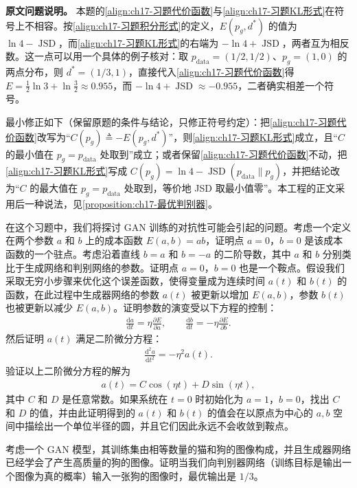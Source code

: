 \documentclass[../../main.tex]{subfiles}
\begin{document}
\begin{remark}\textbf{原文问题说明。}
本题的\eqref{align:ch17-习题代价函数}与\eqref{align:ch17-习题KL形式}在符号上不相容。按\eqref{align:ch17-习题积分形式}的定义，$E(p_g,d^*)$ 的值为 $\ln4-\operatorname{JSD}$，而\eqref{align:ch17-习题KL形式}的右端为 $-\ln4+\operatorname{JSD}$，两者互为相反数。这一点可以用一个具体的例子核对：取 $p_{\mathrm{data}}=(1/2,1/2)$、$p_g=(1,0)$ 的两点分布，则 $d^*=(1/3,1)$，直接代入\eqref{align:ch17-习题代价函数}得 $E=\tfrac12\ln3+\ln\tfrac32\approx0.955$，而 $-\ln4+\operatorname{JSD}\approx-0.955$，二者确实相差一个符号。

最小修正如下（保留原题的条件与结论，只修正符号约定）：把\eqref{align:ch17-习题代价函数}改写为“$C(p_g)\triangleq-E(p_g,d^*)$”，则\eqref{align:ch17-习题KL形式}成立，且“$C$ 的最小值在 $p_g=p_{\mathrm{data}}$ 处取到”成立；或者保留\eqref{align:ch17-习题代价函数}不动，把\eqref{align:ch17-习题KL形式}写成 $C(p_g)=\ln4-\operatorname{JSD}(p_{\mathrm{data}}\|p_g)$，并把结论改为“$C$ 的最大值在 $p_g=p_{\mathrm{data}}$ 处取到，等价地 JSD 取最小值零”。本工程的正文采用后一种说法，见\cref{proposition:ch17-最优判别器}。
\end{remark}

\begin{exercise}[$\star\star\star$]\label{exercise:ch17-02}
在这个习题中，我们将探讨 GAN 训练的对抗性可能会引起的问题。考虑一个定义在两个参数 $a$ 和 $b$ 上的成本函数 $E(a,b)=ab$，证明点 $a=0$，$b=0$ 是该成本函数的一个驻点。考虑沿着直线 $b=a$ 和 $b=-a$ 的二阶导数，其中 $a$ 和 $b$ 分别类比于生成网络和判别网络的参数。证明点 $a=0$，$b=0$ 也是一个鞍点。假设我们采取无穷小步骤来优化这个误差函数，使得变量成为连续时间 $a(t)$ 和 $b(t)$ 的函数，在此过程中生成器网络的参数 $a(t)$ 被更新以增加 $E(a,b)$，参数 $b(t)$ 也被更新以减少 $E(a,b)$。证明参数的演变受以下方程的控制：
\begin{align}
\frac{\mathrm{d}a}{\mathrm{d}t}=\eta\frac{\partial E}{\partial a},\qquad
\frac{\mathrm{d}b}{\mathrm{d}t}=-\eta\frac{\partial E}{\partial b}.
\label{align:ch17-鞍点动力学}
\end{align}
然后证明 $a(t)$ 满足二阶微分方程：
\begin{align}
\frac{\mathrm{d}^2a}{\mathrm{d}t^2}=-\eta^2a(t).
\label{align:ch17-二阶方程}
\end{align}
验证以上二阶微分方程的解为
\begin{align}
a(t)=C\cos(\eta t)+D\sin(\eta t),
\label{align:ch17-二阶方程解}
\end{align}
其中 $C$ 和 $D$ 是任意常数。如果系统在 $t=0$ 时初始化为 $a=1$，$b=0$，找出 $C$ 和 $D$ 的值，并由此证明得到的 $a(t)$ 和 $b(t)$ 的值会在以原点为中心的 $a,b$ 空间中描绘出一个单位半径的圆，并且它们因此永远不会收敛到鞍点。
\end{exercise}

\begin{exercise}[$\star\star$]\label{exercise:ch17-03}
考虑一个 GAN 模型，其训练集由相等数量的猫和狗的图像构成，并且生成器网络已经学会了产生高质量的狗的图像。证明当我们向判别器网络（训练目标是输出一个图像为真的概率）输入一张狗的图像时，最优输出是 $1/3$。
\end{exercise}
\end{document}
